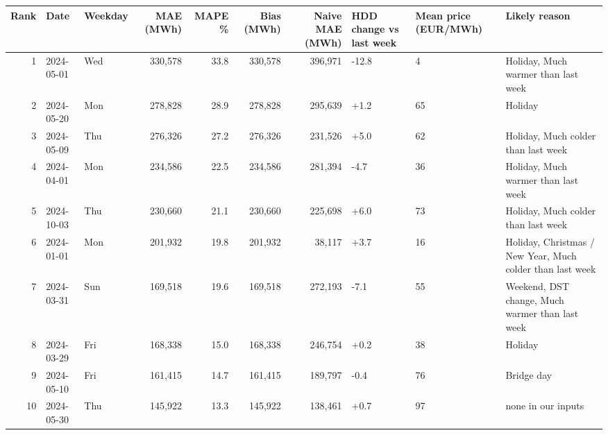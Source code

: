 \begin{tabular}{rllrrrrlll}
\toprule
Rank & Date & Weekday & MAE (MWh) & MAPE \% & Bias (MWh) & Naive MAE (MWh) & HDD change vs last week & Mean price (EUR/MWh) & Likely reason \\
\midrule
1 & 2024-05-01 & Wed & 330,578 & 33.8 & 330,578 & 396,971 & -12.8 & 4 & Holiday, Much warmer than last week \\
2 & 2024-05-20 & Mon & 278,828 & 28.9 & 278,828 & 295,639 & +1.2 & 65 & Holiday \\
3 & 2024-05-09 & Thu & 276,326 & 27.2 & 276,326 & 231,526 & +5.0 & 62 & Holiday, Much colder than last week \\
4 & 2024-04-01 & Mon & 234,586 & 22.5 & 234,586 & 281,394 & -4.7 & 36 & Holiday, Much warmer than last week \\
5 & 2024-10-03 & Thu & 230,660 & 21.1 & 230,660 & 225,698 & +6.0 & 73 & Holiday, Much colder than last week \\
6 & 2024-01-01 & Mon & 201,932 & 19.8 & 201,932 & 38,117 & +3.7 & 16 & Holiday, Christmas / New Year, Much colder than last week \\
7 & 2024-03-31 & Sun & 169,518 & 19.6 & 169,518 & 272,193 & -7.1 & 55 & Weekend, DST change, Much warmer than last week \\
8 & 2024-03-29 & Fri & 168,338 & 15.0 & 168,338 & 246,754 & +0.2 & 38 & Holiday \\
9 & 2024-05-10 & Fri & 161,415 & 14.7 & 161,415 & 189,797 & -0.4 & 76 & Bridge day \\
10 & 2024-05-30 & Thu & 145,922 & 13.3 & 145,922 & 138,461 & +0.7 & 97 & none in our inputs \\
\bottomrule
\end{tabular}

